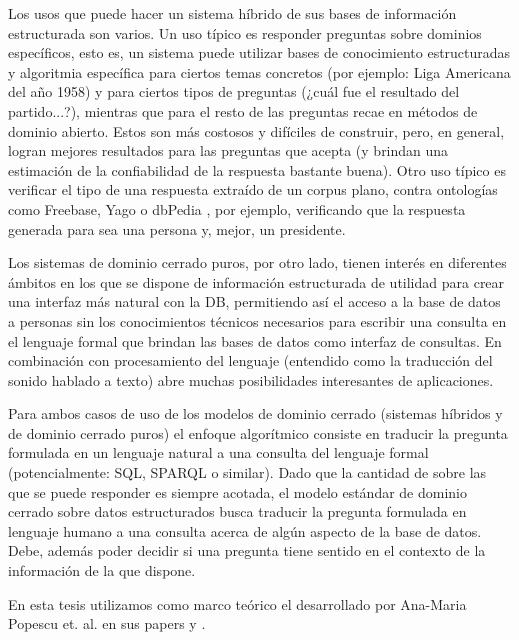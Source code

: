 Los usos que puede hacer un sistema híbrido de sus bases de información estructurada son varios. Un uso típico es responder preguntas sobre dominios específicos, esto es, un sistema puede utilizar bases de conocimiento estructuradas y algoritmia específica para ciertos temas concretos (por ejemplo: Liga Americana del año 1958) y para ciertos tipos de preguntas (¿cuál fue el resultado del partido...?), mientras que para el resto de las preguntas recae en métodos de dominio abierto. Estos  son más costosos y difíciles de construir, pero, en general, logran mejores resultados para las preguntas que acepta (y brindan una estimación de la confiabilidad de la respuesta bastante buena). Otro uso típico es verificar el tipo de una respuesta extraído de un corpus plano, contra ontologías como Freebase, Yago o dbPedia \cite{WATSON2}, por ejemplo, verificando que la respuesta generada para  sea una persona y, mejor, un presidente.

Los sistemas de dominio cerrado puros, por otro lado, tienen interés en diferentes ámbitos en los que se dispone de información estructurada de utilidad para crear una interfaz más natural con la DB, permitiendo así el acceso a la base de datos a personas sin los conocimientos técnicos necesarios para escribir una consulta en el lenguaje formal que brindan las bases de datos como interfaz de consultas. En combinación con procesamiento del lenguaje (entendido como la traducción del sonido hablado a texto) abre muchas posibilidades interesantes de aplicaciones.

Para ambos casos de uso de los modelos de dominio cerrado (sistemas híbridos y de dominio cerrado puros) el enfoque algorítmico consiste en traducir la pregunta formulada en un lenguaje natural a una consulta del lenguaje formal (potencialmente: SQL, SPARQL o similar). Dado que la cantidad de  sobre las que se puede responder es siempre acotada, el modelo estándar de dominio cerrado sobre datos estructurados busca traducir la pregunta formulada en lenguaje humano a una consulta acerca de algún aspecto de la base de datos. Debe, además poder decidir si una pregunta tiene sentido en el contexto de la información de la que dispone.


En esta tesis utilizamos como marco teórico el desarrollado por Ana-Maria Popescu et. al. en sus papers \cite{QADB1} y \cite{QADB2}.


